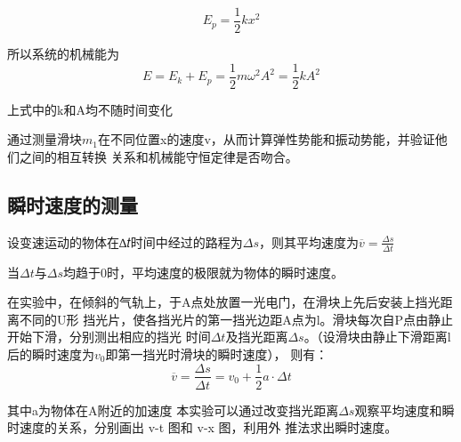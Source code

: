 \documentclass[11pt,a4paper]{article}
\begin{document}
\begin{equation}
    {E_p} = \frac{1}{2}k{x^2}
\end{equation}

所以系统的机械能为
\begin{equation}
    E = {E_k} + {E_p} = \frac{1}{2}m{\omega ^2}{A^2} = \frac{1}{2}k{A^2}
\end{equation}

上式中的k和A均不随时间变化

通过测量滑块$m_1$在不同位置x的速度v，从而计算弹性势能和振动势能，并验证他们之间的相互转换
关系和机械能守恒定律是否吻合。

\subsection{瞬时速度的测量}
设变速运动的物体在∆𝑡时间中经过的路程为$\Delta s$，则其平均速度为$\overline v  = \frac{{\Delta s}}{{\Delta t}}$

当$\Delta t$与$\Delta s$均趋于0时，平均速度的极限就为物体的瞬时速度。

在实验中，在倾斜的气轨上，于A点处放置一光电门，在滑块上先后安装上挡光距离不同的U形
挡光片，使各挡光片的第一挡光边距A点为l。滑块每次自P点由静止开始下滑，分别测出相应的挡光
时间$\Delta t$及挡光距离$\Delta s$。（设滑块由静止下滑距离l后的瞬时速度为$v_0$即第一挡光时滑块的瞬时速度），
则有：
\begin{equation}
    \overline v  = \frac{{\Delta s}}{{\Delta t}} = {v_0} + \frac{1}{2}a \cdot \Delta t
\end{equation}

其中a为物体在A附近的加速度
本实验可以通过改变挡光距离$\Delta s$观察平均速度和瞬时速度的关系，分别画出 v-t 图和 v-x 图，利用外
推法求出瞬时速度。
\end{document}
